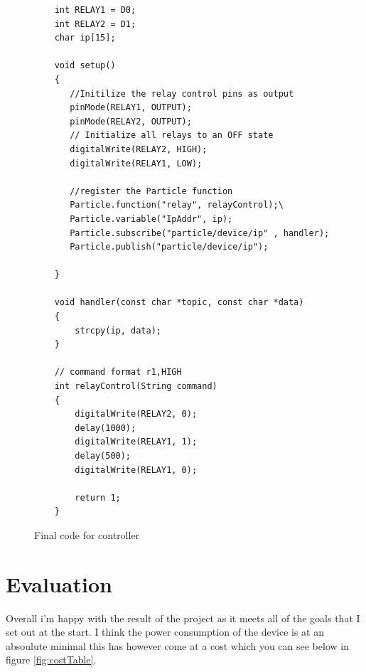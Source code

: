 \documentclass{article}
\begin{document}
\begin{figure}[H]
    \begin{lstlisting}
    int RELAY1 = D0;
    int RELAY2 = D1;
    char ip[15];

    void setup()
    {
       //Initilize the relay control pins as output
       pinMode(RELAY1, OUTPUT);
       pinMode(RELAY2, OUTPUT);
       // Initialize all relays to an OFF state
       digitalWrite(RELAY2, HIGH);
       digitalWrite(RELAY1, LOW);

       //register the Particle function
       Particle.function("relay", relayControl);\
       Particle.variable("IpAddr", ip);
       Particle.subscribe("particle/device/ip" , handler);
       Particle.publish("particle/device/ip");

    }

    void handler(const char *topic, const char *data)
    {
        strcpy(ip, data);
    }

    // command format r1,HIGH
    int relayControl(String command)
    {
        digitalWrite(RELAY2, 0);
        delay(1000);
        digitalWrite(RELAY1, 1);
        delay(500);
        digitalWrite(RELAY1, 0);

        return 1;
    }
    \end{lstlisting}
    \caption{Final code for controller} \label{fig:interfaceCode}
    \vspace{0.5cm}
\end{figure}


\section{Evaluation}

Overall i'm happy with the result of the project as it meets all of the goals that I set out at
the start. I think the power consumption of the device is at an absoulute minimal this has however
come at a cost which you can see below in figure \ref{fig:costTable}.
\end{document}
